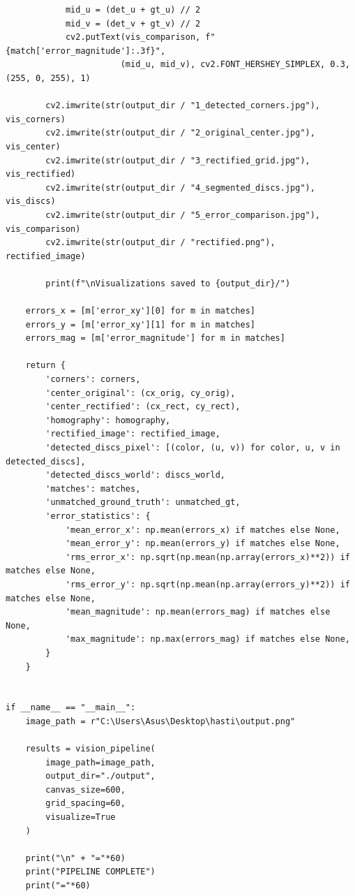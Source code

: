 \documentclass{article}
\begin{document}
\begin{latin}
\begin{LTR}
\begin{verbatim}
            mid_u = (det_u + gt_u) // 2
            mid_v = (det_v + gt_v) // 2
            cv2.putText(vis_comparison, f"{match['error_magnitude']:.3f}", 
                       (mid_u, mid_v), cv2.FONT_HERSHEY_SIMPLEX, 0.3, (255, 0, 255), 1)
        
        cv2.imwrite(str(output_dir / "1_detected_corners.jpg"), vis_corners)
        cv2.imwrite(str(output_dir / "2_original_center.jpg"), vis_center)
        cv2.imwrite(str(output_dir / "3_rectified_grid.jpg"), vis_rectified)
        cv2.imwrite(str(output_dir / "4_segmented_discs.jpg"), vis_discs)
        cv2.imwrite(str(output_dir / "5_error_comparison.jpg"), vis_comparison)
        cv2.imwrite(str(output_dir / "rectified.png"), rectified_image)
        
        print(f"\nVisualizations saved to {output_dir}/")
    
    errors_x = [m['error_xy'][0] for m in matches]
    errors_y = [m['error_xy'][1] for m in matches]
    errors_mag = [m['error_magnitude'] for m in matches]
    
    return {
        'corners': corners,
        'center_original': (cx_orig, cy_orig),
        'center_rectified': (cx_rect, cy_rect),
        'homography': homography,
        'rectified_image': rectified_image,
        'detected_discs_pixel': [(color, (u, v)) for color, u, v in detected_discs],
        'detected_discs_world': discs_world,
        'matches': matches,
        'unmatched_ground_truth': unmatched_gt,
        'error_statistics': {
            'mean_error_x': np.mean(errors_x) if matches else None,
            'mean_error_y': np.mean(errors_y) if matches else None,
            'rms_error_x': np.sqrt(np.mean(np.array(errors_x)**2)) if matches else None,
            'rms_error_y': np.sqrt(np.mean(np.array(errors_y)**2)) if matches else None,
            'mean_magnitude': np.mean(errors_mag) if matches else None,
            'max_magnitude': np.max(errors_mag) if matches else None,
        }
    }


if __name__ == "__main__":
    image_path = r"C:\Users\Asus\Desktop\hasti\output.png"
    
    results = vision_pipeline(
        image_path=image_path,
        output_dir="./output",
        canvas_size=600,
        grid_spacing=60,
        visualize=True
    )
    
    print("\n" + "="*60)
    print("PIPELINE COMPLETE")
    print("="*60)

\end{verbatim}
\end{LTR}
\end{latin}
\end{document}
